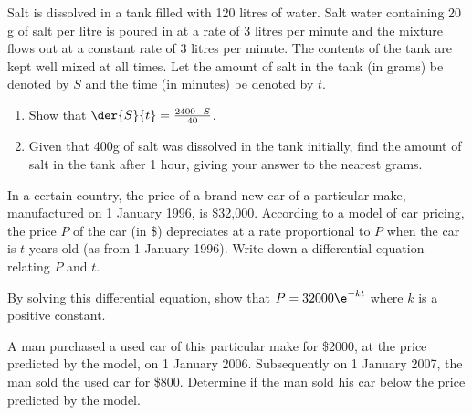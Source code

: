 \begin{problem}
    Salt is dissolved in a tank filled with 120 litres of water. Salt water containing 20 g of salt per litre is poured in at a rate of 3 litres per minute and the mixture flows out at a constant rate of 3 litres per minute. The contents of the tank are kept well mixed at all times. Let the amount of salt in the tank (in grams) be denoted by $S$ and the time (in minutes) be denoted by $t$. 

    \begin{enumerate}
        \item Show that $\der{S}{t} = \frac{2400-S}{40}$.
        \item Given that 400g of salt was dissolved in the tank initially, find the amount of salt in the tank after 1 hour, giving your answer to the nearest grams. 
    \end{enumerate}
\end{problem}

\begin{problem}
    In a certain country, the price of a brand-new car of a particular make, manufactured on 1 January 1996, is \$32,000. According to a model of car pricing, the price $P$ of the car (in \$) depreciates at a rate proportional to $P$ when the car is $t$ years old (as from 1 January 1996). Write down a differential equation relating $P$ and $t$.
    
    By solving this differential equation, show that $P = 32000\e^{-kt}$ where $k$ is a positive constant.
    
    A man purchased a used car of this particular make for \$2000, at the price predicted by the model, on 1 January 2006. Subsequently on 1 January 2007, the man sold the used car for \$800. Determine if the man sold his car below the price predicted by the model.
\end{problem}